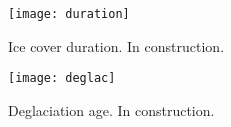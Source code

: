 \documentclass[tc, ms]{copernicus}
\begin{document}
\begin{figure}
  \texttt{[image: duration]}
  \caption{Ice cover duration. In construction.}
  \label{fig:duration}
\end{figure}

\begin{figure}
  \texttt{[image: deglac]}
  \caption{Deglaciation age. In construction.}
  \label{fig:deglac}
\end{figure}

\end{document}
